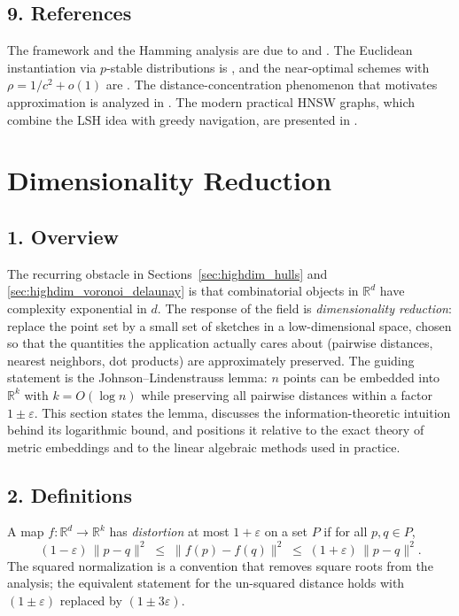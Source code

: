 \subsection{9. References}

The framework and the Hamming analysis are due to \cite{indyk1998} and
\cite{gionis1999}. The Euclidean instantiation via $p$-stable distributions is
\cite{datar2004}, and the near-optimal schemes with $\rho = 1/c^2 + o(1)$ are
\cite{andoni2006}. The distance-concentration phenomenon that motivates
approximation is analyzed in \cite{beyer1999}. The modern practical HNSW
graphs, which combine the LSH idea with greedy navigation, are presented in
\cite{malkov2018}.

\section{Dimensionality Reduction}
\label{sec:highdim_dimensionality_reduction}

\subsection{1. Overview}

The recurring obstacle in Sections~\ref{sec:highdim_hulls} and
\ref{sec:highdim_voronoi_delaunay} is that combinatorial objects in
$\mathbb{R}^d$ have complexity exponential in $d$. The response of the field
is \emph{dimensionality reduction}: replace
the point set by a small set of sketches in a low-dimensional space, chosen so
that the quantities the application actually cares about (pairwise distances,
nearest neighbors, dot products) are approximately preserved. The guiding
statement is the Johnson--Lindenstrauss
lemma: $n$ points can be embedded into $\mathbb{R}^k$ with
$k = O(\log n)$ while preserving all pairwise distances within a factor
$1 \pm \varepsilon$. This section states the lemma, discusses the
information-theoretic intuition behind its logarithmic bound, and positions it
relative to the exact theory of metric embeddings and to the linear algebraic
methods used in practice.

\subsection{2. Definitions}

\begin{definition}
\label{def:highdim_distortion}
A map $f: \mathbb{R}^d \to \mathbb{R}^k$ has \emph{distortion} at most
$1 + \varepsilon$ on a set $P$ if for all $p, q \in P$,
\[
(1 - \varepsilon)\,\|p - q\|^2 \;\le\; \|f(p) - f(q)\|^2 \;\le\; (1 + \varepsilon)\,\|p - q\|^2.
\]
The squared normalization is a convention that removes square roots from the
analysis; the equivalent statement for the un-squared distance holds with
$(1 \pm \varepsilon)$ replaced by $(1 \pm 3\varepsilon)$.
\end{definition}

